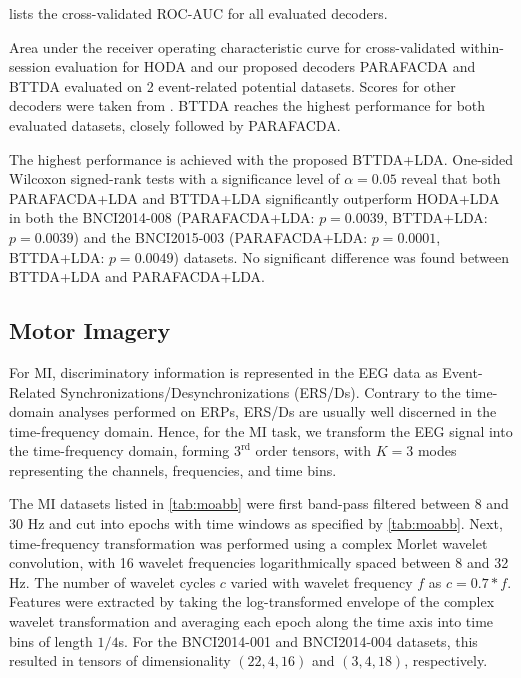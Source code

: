  lists the cross-validated ROC-AUC for all evaluated
decoders.
\begin{table}[t]
	
  \caption[Within-session classification score for 2 event-related potential
  datasets.]{Area under the receiver operating characteristic curve for
		cross-validated within-session evaluation for HODA and our proposed decoders
		PARAFACDA and BTTDA evaluated on 2 event-related potential datasets.
    Scores for other decoders were taken from \textcite{Chevallier2024}.
		BTTDA reaches the highest performance for both evaluated datasets, closely
		followed by PARAFACDA.
	}
	\label{tab:erp-score}
\end{table}
The highest performance is achieved with the proposed BTTDA+LDA.
One-sided Wilcoxon signed-rank tests with a significance level of $\alpha=0.05$
reveal that both PARAFACDA+LDA and BTTDA+LDA significantly outperform
HODA+LDA in both the BNCI2014-008 (PARAFACDA+LDA: $p=0.0039$, BTTDA+LDA:
$p=0.0039$) and the BNCI2015-003 (PARAFACDA+LDA: $p=0.0001$, BTTDA+LDA:
$p=0.0049$) datasets.
No significant difference was found between BTTDA+LDA and PARAFACDA+LDA.


\subsection{Motor Imagery}
For MI, discriminatory information is represented in the EEG data as
Event-Related Synchronizations/Desynchronizations (ERS/Ds).
Contrary to the time-domain analyses performed on ERPs, ERS/Ds are usually well
discerned in the time-frequency domain.
Hence, for the MI task, we transform the EEG signal into the
time-frequency domain, forming $3^\text{rd}$ order tensors, with $K=3$ modes
representing the channels, frequencies, and time bins.

The MI datasets listed in \cref{tab:moabb} were first band-pass filtered
between 8 and 30 Hz and cut into
epochs with time windows as specified by \cref{tab:moabb}.
Next, time-frequency transformation was performed using a complex Morlet wavelet
convolution, with 16 wavelet frequencies logarithmically spaced between 8 and
32 Hz.
The number of wavelet cycles $c$ varied with wavelet frequency $f$ as
$c=0.7*f$.
Features were extracted by taking the log-transformed envelope of the complex
wavelet transformation and averaging each epoch along the time axis into time bins of
length $1/4$s.
For the BNCI2014-001 and BNCI2014-004 datasets, this resulted in tensors of dimensionality
$(22, 4, 16)$ and $(3, 4, 18)$, respectively.

